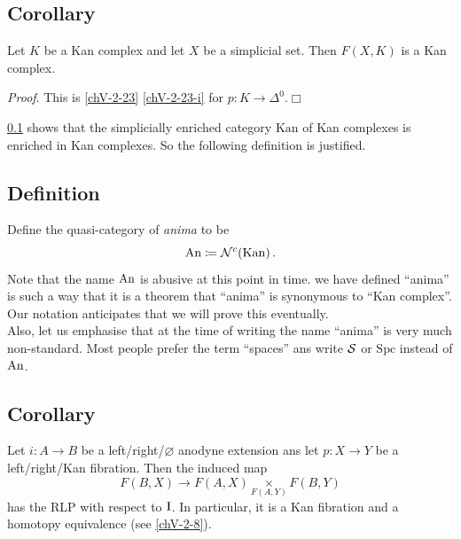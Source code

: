     \subsection{Corollary}\label{chV-2-24}
        Let $K$ be a Kan complex and let $X$ be a simplicial set. Then $F(X, K)$ is a Kan complex.
        \smallskip

        \emph{Proof}. This is \ref{chV-2-23} \ref{chV-2-23-i} for $p \colon K \to \Delta^0$.\hfill$\Box$
        \medskip

        \ref{chV-2-24} shows that the simplicially enriched category $\mathrm{Kan}$ of Kan complexes is enriched in Kan complexes. So the following definition is justified.

    \subsection{Definition}\label{chV-2-25}
        Define the quasi-category of \emph{anima} to be
        \begin{equation*}
            \operatorname{An} \coloneq \mathcal{N}^c(\mathrm{Kan}) \,.
        \end{equation*}
        Note that the name $\operatorname{An}$ is abusive at this point in time. we have defined ``anima'' is such a way that it is a theorem that ``anima'' is synonymous to ``Kan complex''. Our notation anticipates that we will prove this eventually.\\
        Also, let us emphasise that at the time of writing the name ``anima'' is very much non-standard. Most people prefer the term ``spaces'' ans write $\mathcal{S}$ or $\mathrm{Spc}$ instead of $\operatorname{An}$.

    \subsection{Corollary}\label{chV-2-26}
        Let $i \colon A \to B$ be a left/right/$\varnothing$ anodyne extension ans let $p \colon X \to Y$ be a left/right/Kan fibration. Then the induced map
        \begin{equation*}
            F(B, X) \to F(A, X) \underset{F(A, Y)}{\times} F(B, Y) 
        \end{equation*}
        has the RLP with respect to $\mathrm{I}$. In particular, it is a Kan fibration and a homotopy equivalence (see \ref{chV-2-8}).
        \smallskip

